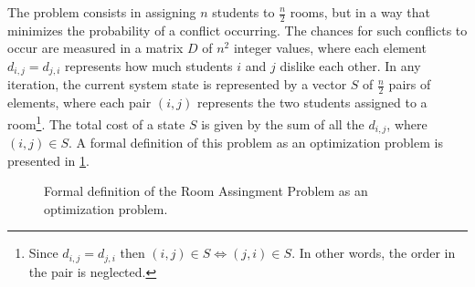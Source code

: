 \documentclass[abstract=on,9pt,twocolumn]{scrartcl}
\begin{document}
The problem consists in assigning $n$ students to $\frac{n}{2}$ rooms, but in a way that minimizes the probability of a conflict occurring. The chances for such conflicts to occur are measured in a matrix $D$ of $n^{2}$ integer values, where each element $d_{i,j} = d_{j,i}$ represents how much students $i$ and $j$ dislike each other. In any iteration, the current system state is represented by a vector $S$ of $\frac{n}{2}$ pairs of elements, where each pair $(i,j)$ represents the two students assigned to a room\footnote{Since $d_{i,j}=d_{j,i}$ then $(i,j)\in S\Leftrightarrow(j,i)\in S$. In other words, the order in the pair is neglected.}. The total cost of a state $S$ is given by the sum of all the $d_{i,j}$, where $(i,j)\in S$. A formal definition of this problem as an optimization problem is presented in \cref{fig:formaldef}.

\begin{figure}
	\begin{center}
	\end{center}
	\caption{Formal definition of the Room Assingment Problem as an optimization problem.}
	\label{fig:formaldef}
\end{figure}
\end{document}
